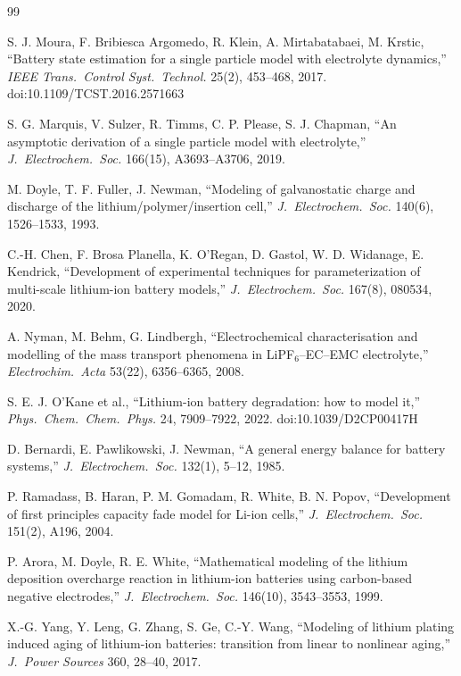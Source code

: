 \documentclass[11pt]{article}
\begin{document}
\begin{thebibliography}{99}\small

 S. J. Moura, F. Bribiesca Argomedo, R. Klein, A. Mirtabatabaei, M. Krstic, ``Battery state estimation for a single particle model with electrolyte dynamics,'' \emph{IEEE Trans.\ Control Syst.\ Technol.} 25(2), 453--468, 2017. doi:10.1109/TCST.2016.2571663

 S. G. Marquis, V. Sulzer, R. Timms, C. P. Please, S. J. Chapman, ``An asymptotic derivation of a single particle model with electrolyte,'' \emph{J.\ Electrochem.\ Soc.} 166(15), A3693--A3706, 2019.

 M. Doyle, T. F. Fuller, J. Newman, ``Modeling of galvanostatic charge and discharge of the lithium/polymer/insertion cell,'' \emph{J.\ Electrochem.\ Soc.} 140(6), 1526--1533, 1993.

 C.-H. Chen, F. Brosa Planella, K. O'Regan, D. Gastol, W. D. Widanage, E. Kendrick, ``Development of experimental techniques for parameterization of multi-scale lithium-ion battery models,'' \emph{J.\ Electrochem.\ Soc.} 167(8), 080534, 2020.

 A. Nyman, M. Behm, G. Lindbergh, ``Electrochemical characterisation and modelling of the mass transport phenomena in LiPF$_6$--EC--EMC electrolyte,'' \emph{Electrochim.\ Acta} 53(22), 6356--6365, 2008.

 S. E. J. O'Kane et al., ``Lithium-ion battery degradation: how to model it,'' \emph{Phys.\ Chem.\ Chem.\ Phys.} 24, 7909--7922, 2022. doi:10.1039/D2CP00417H

 D. Bernardi, E. Pawlikowski, J. Newman, ``A general energy balance for battery systems,'' \emph{J.\ Electrochem.\ Soc.} 132(1), 5--12, 1985.

 P. Ramadass, B. Haran, P. M. Gomadam, R. White, B. N. Popov, ``Development of first principles capacity fade model for Li-ion cells,'' \emph{J.\ Electrochem.\ Soc.} 151(2), A196, 2004.

 P. Arora, M. Doyle, R. E. White, ``Mathematical modeling of the lithium deposition overcharge reaction in lithium-ion batteries using carbon-based negative electrodes,'' \emph{J.\ Electrochem.\ Soc.} 146(10), 3543--3553, 1999.

 X.-G. Yang, Y. Leng, G. Zhang, S. Ge, C.-Y. Wang, ``Modeling of lithium plating induced aging of lithium-ion batteries: transition from linear to nonlinear aging,'' \emph{J.\ Power Sources} 360, 28--40, 2017.


\end{thebibliography}
\end{document}
